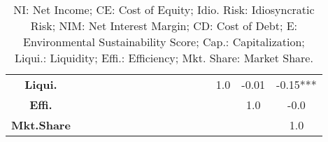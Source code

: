 \documentclass[11pt, a4paper]{article}
\begin{document}
\begin{landscape}
\begin{table}[htbp]
{\begin{tabular}{cccccccccccccccc}
\textbf{Liqui.} &  &  &  &  &  &  &  &  &  &  &  &  & \textcolor{cor-very-strong}{1.0} & \textcolor{cor-very-weak}{-0.01} & \textcolor{cor-very-weak}{-0.15***}\\ 
\textbf{Effi.} &  &  &  &  &  &  &  &  &  &  &  &  &  & \textcolor{cor-very-strong}{1.0} & \textcolor{cor-very-weak}{-0.0}\\
\textbf{Mkt.Share} &  &  &  &  &  &  &  &  &  &  &  &  &  &  & \textcolor{cor-very-strong}{1.0}\\ \bottomrule
\end{tabular}}
\caption*{NI: Net Income; CE: Cost of Equity; Idio. Risk: Idiosyncratic Risk; NIM: Net Interest Margin; CD: Cost of Debt; E: Environmental Sustainability Score; Cap.: Capitalization; Liqui.: Liquidity; Effi.: Efficiency; Mkt. Share: Market Share.}
\renewcommand{\arraystretch}{1}
\end{table}
\end{landscape}
\end{document}
